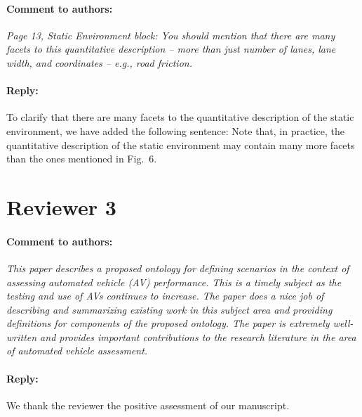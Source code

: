 \documentclass[10pt,final,a4paper,oneside,onecolumn]{article}
\newcommand{\toauthor}{\paragraph*{Comment to authors:} \itshape}
\newcommand{\fromauthor}{\paragraph*{Reply:} \normalfont}
\newcommand{\cstart}{\cbstart\color{red}}
\newcommand{\cend}{\cbend\color{black}}
\begin{document}
\toauthor Page 13, Static Environment block: You should mention that there are many facets to this quantitative description -- more than just number of lanes, lane width, and coordinates -- e.g., road friction.

\fromauthor To clarify that there are many facets to the quantitative description of the static environment, we have added the following sentence: \cstart Note that, in practice, the quantitative description of the static environment may contain many more facets than the ones mentioned in Fig.~6.\cend



\section*{Reviewer 3}

\toauthor This paper describes a proposed ontology for defining scenarios in the context of assessing automated vehicle (AV) performance. This is a timely subject as the testing and use of AVs continues to increase. The paper does a nice job of describing and summarizing existing work in this subject area and providing definitions for components of the proposed ontology. The paper is extremely well-written and provides important contributions to the research literature in the area of automated vehicle assessment.

\fromauthor We thank the reviewer the positive assessment of our manuscript.



\printbibliography
\end{document}
